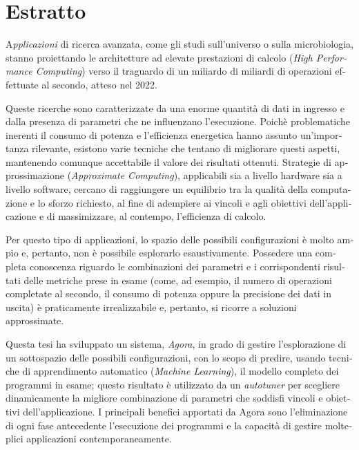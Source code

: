 \chapter*{Estratto}

\begin{otherlanguage}{italian}

\lettrine{A}{}\textit{pplicazioni} di ricerca avanzata, come gli studi sull'universo o sulla microbiologia, stanno proiettando le architetture ad elevate prestazioni di calcolo (\textit{High Performance Computing}) verso il traguardo di un miliardo di miliardi di operazioni effettuate al secondo, atteso nel 2022.

Queste ricerche sono caratterizzate da una enorme quantità di dati in ingresso e dalla presenza di parametri che ne influenzano l'esecuzione. Poichè problematiche inerenti il consumo di potenza e l'efficienza energetica hanno assunto un'importanza rilevante, esistono varie tecniche che tentano di migliorare questi aspetti, mantenendo comunque accettabile il valore dei risultati ottenuti. Strategie di approssimazione (\textit{Ap\-prox\-i\-mate Com\-put\-ing}), applicabili sia a livello hardware sia a livello software, cercano di raggiungere un equilibrio tra la qualità della computazione e lo sforzo richiesto, al fine di adempiere ai vincoli e agli obiettivi dell'applicazione e di massimizzare, al contempo, l'efficienza di calcolo.

Per questo tipo di applicazioni, lo spazio delle possibili configurazioni è molto ampio e, pertanto, non è possibile esplorarlo esaustivamente. Possedere una completa conoscenza riguardo le combinazioni dei parametri e i corrispondenti risultati delle metriche prese in esame (come, ad esempio, il numero di operazioni completate al secondo, il consumo di potenza oppure la precisione dei dati in uscita) è praticamente irrealizzabile e, pertanto, si ricorre a soluzioni approssimate.

Questa tesi ha sviluppato un sistema, \textit{Agora}, in grado di gestire l'esplorazione di un sottospazio delle possibili configurazioni, con lo scopo di predire, usando tecniche di apprendimento automatico (\textit{Machine Learning}), il modello completo dei programmi in esame; questo risultato è utilizzato da un \textit{autotuner} per sce\-glie\-re dinamicamente la migliore combinazione di parametri che soddisfi vincoli e obiettivi dell'applicazione. I principali benefici apportati da Agora sono l'eliminazione di ogni fase an\-te\-ce\-den\-te l'esecuzione dei programmi e la capacità di gestire molteplici applicazioni contemporaneamente.

\end{otherlanguage}
